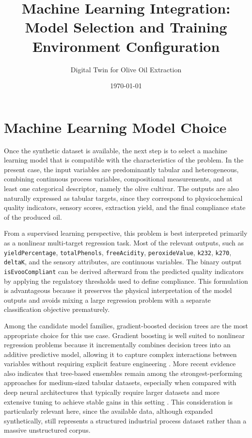 \documentclass[11pt,a4paper]{article}
\title{Machine Learning Integration: Model Selection and Training Environment Configuration}
\author{Digital Twin for Olive Oil Extraction}
\date{\today}
\begin{document}
\maketitle

\section{Machine Learning Model Choice}
\label{sec:model_choice}

Once the synthetic dataset is available, the next step is to select a machine learning model that is compatible with the characteristics of the problem. In the present case, the input variables are predominantly tabular and heterogeneous, combining continuous process variables, compositional measurements, and at least one categorical descriptor, namely the olive cultivar. The outputs are also naturally expressed as tabular targets, since they correspond to physicochemical quality indicators, sensory scores, extraction yield, and the final compliance state of the produced oil.

From a supervised learning perspective, this problem is best interpreted primarily as a nonlinear multi-target regression task. Most of the relevant outputs, such as \texttt{yieldPercentage}, \texttt{totalPhenols}, \texttt{freeAcidity}, \texttt{peroxideValue}, \texttt{k232}, \texttt{k270}, \texttt{deltaK}, and the sensory attributes, are continuous variables. The binary output \texttt{isEvooCompliant} can be derived afterward from the predicted quality indicators by applying the regulatory thresholds used to define compliance. This formulation is advantageous because it preserves the physical interpretation of the model outputs and avoids mixing a large regression problem with a separate classification objective prematurely.

Among the candidate model families, gradient-boosted decision trees are the most appropriate choice for this use case. Gradient boosting is well suited to nonlinear regression problems because it incrementally combines decision trees into an additive predictive model, allowing it to capture complex interactions between variables without requiring explicit feature engineering \cite{Friedman2001}. More recent evidence also indicates that tree-based ensembles remain among the strongest-performing approaches for medium-sized tabular datasets, especially when compared with deep neural architectures that typically require larger datasets and more extensive tuning to achieve stable gains in this setting \cite{Grinsztajn2022}. This consideration is particularly relevant here, since the available data, although expanded synthetically, still represents a structured industrial process dataset rather than a massive unstructured corpus.
\end{document}
